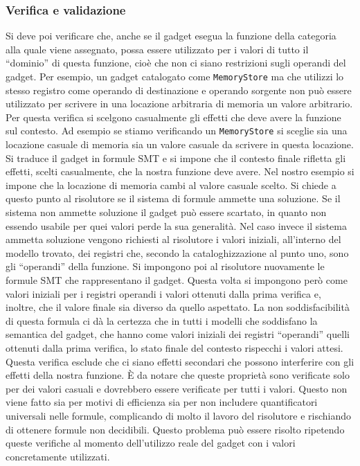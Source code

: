 \subsubsection{Verifica e validazione}\label{s:verifica_validazione}
Si deve poi verificare che, anche se il gadget esegua la funzione
della categoria alla quale viene assegnato, possa essere utilizzato
per i valori di tutto il ``dominio'' di questa funzione, cioè che non
ci siano restrizioni sugli operandi del gadget. Per esempio, un gadget
catalogato come \lstinline{MemoryStore} ma che utilizzi lo stesso
registro come operando di destinazione e operando sorgente non può
essere utilizzato per scrivere in una locazione arbitraria di memoria
un valore arbitrario. Per questa verifica si scelgono casualmente gli
effetti che deve avere la funzione sul contesto. Ad esempio se stiamo
verificando un \lstinline{MemoryStore} si sceglie sia una locazione
casuale di memoria sia un valore casuale da scrivere in questa
locazione. Si traduce il gadget in formule SMT e si impone che il
contesto finale rifletta gli effetti, scelti casualmente, che la
nostra funzione deve avere. Nel nostro esempio si impone che la
locazione di memoria cambi al valore casuale scelto. Si chiede a
questo punto al risolutore se il sistema di formule ammette una
soluzione. Se il sistema non ammette soluzione il gadget può essere
scartato, in quanto non essendo usabile per quei valori perde la sua
generalità. Nel caso invece il sistema ammetta soluzione vengono
richiesti al risolutore i valori iniziali, all'interno del modello
trovato, dei registri che, secondo la cataloghizzazione al punto uno,
sono gli ``operandi'' della funzione. Si impongono poi al risolutore
nuovamente le formule SMT che rappresentano il gadget.  Questa volta
si impongono però come valori iniziali per i registri operandi i
valori ottenuti dalla prima verifica e, inoltre, che il valore finale
sia diverso da quello aspettato. La non soddisfacibilità di questa
formula ci dà la certezza che in tutti i modelli che soddisfano la
semantica del gadget, che hanno come valori iniziali dei registri
``operandi'' quelli ottenuti dalla prima verifica, lo stato finale del
contesto rispecchi i valori attesi. Questa verifica esclude che ci
siano effetti secondari che possono interferire con gli effetti della
nostra funzione. È da notare che queste proprietà sono verificate solo
per dei valori casuali e dovrebbero essere verificate per tutti i
valori. Questo non viene fatto sia per motivi di efficienza sia per
non includere quantificatori universali nelle formule, complicando di
molto il lavoro del risolutore e rischiando di ottenere formule non
decidibili. Questo problema può essere risolto ripetendo queste
verifiche al momento dell'utilizzo reale del gadget con i valori
concretamente utilizzati.

